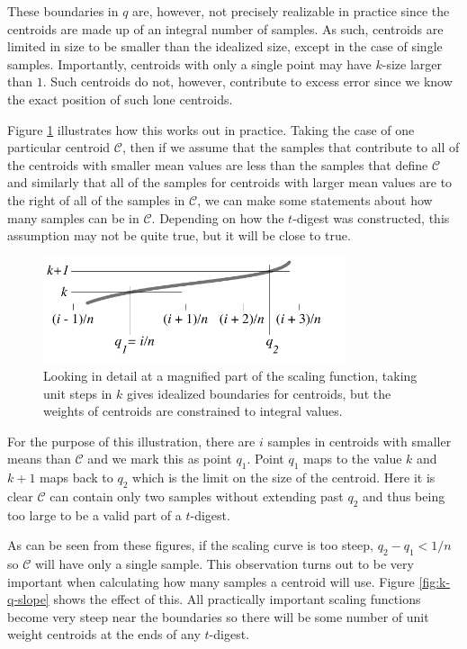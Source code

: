 \documentclass[11pt]{amsart}
\begin{document}
These boundaries in $q$ are, however, not precisely realizable in practice since the centroids are made up of an integral number of samples. As such, centroids are limited in size to be smaller than the idealized size, except in the case of single samples. Importantly, centroids with only a single point may have $k$-size larger than $1$. Such centroids do not, however, contribute to excess error since we know the exact position of such lone centroids.

Figure \ref{fig:k-q-limits} illustrates how this works out in practice. Taking the case of one particular centroid $\mathcal C$, then if we assume that the samples that contribute to all of the centroids with smaller mean values are less than the samples that define $\mathcal C$ and similarly that all of the samples for centroids with larger mean values are to the right of all of the samples in $\mathcal C$, we can make some statements about how many samples can be in $\mathcal C$. Depending on how the $t$-digest was constructed, this assumption may not be quite true, but it will be close to true.
\begin{figure}[htbp] %
   \centering
   \includegraphics[width=3.5in]{../t-digest-paper/k-q-diagram/k-q-limits.pdf} 
   \caption{Looking in detail at a magnified part of the scaling function, taking unit steps in $k$ gives idealized boundaries for centroids, but the weights of centroids are  constrained to integral values. }
   \label{fig:k-q-limits}
\end{figure}
For the purpose of this illustration, there are $i$ samples in centroids with smaller means than $\mathcal C$ and we mark this as point $q_1$. Point $q_1$ maps to the value $k$ and $k+1$ maps back to $q_2$ which is the limit on the size of the centroid. Here it is clear $\mathcal C$ can contain only two samples without extending past $q_2$ and thus being too large to be a valid part of a $t$-digest.

As can be seen from these figures, if the scaling curve is too steep, $q_2-q_1 < 1/n$ so $\mathcal C$ will have only a single sample. This observation turns out to be very important when calculating how many samples a centroid will use. Figure \ref{fig:k-q-slope} shows the effect of this. All practically important scaling functions become very steep near the boundaries so there will be some number of unit weight centroids at the ends of any $t$-digest. 
\end{document}
